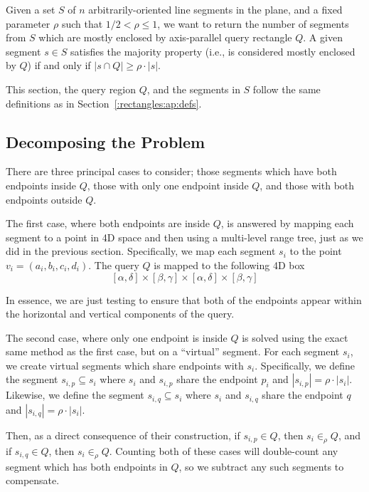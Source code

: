 \begin{problem}
Given a set $S$ of $n$ arbitrarily-oriented line segments in the plane, and a fixed parameter $\rho$ such that $1/2 < \rho \leq 1$, we want to return the number of segments from $S$ which are mostly enclosed by axis-parallel query rectangle $Q$. A given segment $s \in S$ satisfies the majority property (i.e., is considered mostly enclosed by $Q$) if and only if $|s \cap Q| \geq \rho \cdot |s|$.
\end{problem}

This section, the query region $Q$, and the segments in $S$ follow the same definitions as in Section~\ref{:rectangles:ap:defs}.

\subsection{Decomposing the Problem}
\label{:rectangles:ao:approach}

There are three principal cases to consider; those segments which have both endpoints inside $Q$, those with only one endpoint inside $Q$, and those with both endpoints outside $Q$.  

The first case, where both endpoints are inside $Q$, is answered by mapping each segment to a point in 4D space and then using a multi-level range tree, just as we did in the previous section.  Specifically, we map each segment $s_i$ to the point $v_i = (a_i, b_i, c_i, d_i)$. The query $Q$ is mapped to the following 4D box
\[
[\alpha, \delta] \times [\beta, \gamma] \times [\alpha, \delta] \times [\beta, \gamma]
\]

In essence, we are just testing to ensure that both of the endpoints appear within the horizontal and vertical components of the query.

The second case, where only one endpoint is inside $Q$ is solved using the exact same method as the first case, but on a ``virtual'' segment.  For each segment $s_i$, we create virtual segments which share endpoints with $s_i$.  Specifically, we define the segment $s_{i,p} \subseteq s_i$ where $s_i$ and $s_{i,p}$ share the endpoint $p_i$ and $|s_{i,p}| = \rho \cdot |s_i|$. Likewise, we define the segment $s_{i,q} \subseteq s_i$ where $s_i$ and $s_{i,q}$ share the endpoint $q$ and $|s_{i,q}| = \rho \cdot |s_i|$.

Then, as a direct consequence of their construction, if $s_{i,p} \in Q$, then $s_i \in_\rho Q$, and if $s_{i,q} \in Q$, then $s_i \in_\rho Q$.  Counting both of these cases will double-count any segment which has both endpoints in $Q$, so we subtract any such segments to compensate.

